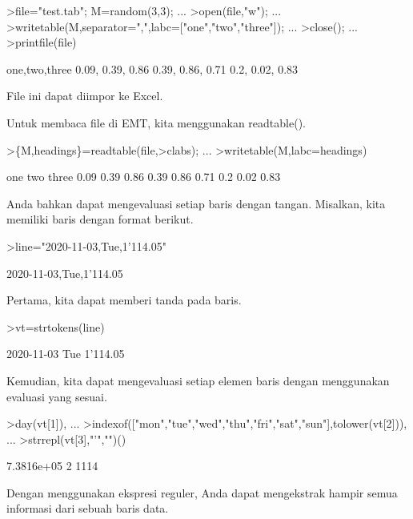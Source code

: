 \documentclass[a4paper,10pt]{article}
\begin{document}
\begin{eulernotebook}
\begin{eulercomment}
\begin{eulercomment}
\begin{eulercomment}
\begin{eulercomment}
\begin{eulerprompt}
>file="test.tab"; M=random(3,3);  ...
>open(file,"w");  ...
>writetable(M,separator=",",labc=["one","two","three"]);  ...
>close(); ...
>printfile(file)
\end{eulerprompt}
\begin{euleroutput}
  one,two,three
        0.09,      0.39,      0.86
        0.39,      0.86,      0.71
         0.2,      0.02,      0.83
\end{euleroutput}
\begin{eulercomment}
File ini dapat diimpor ke Excel.

Untuk membaca file di EMT, kita menggunakan readtable().
\end{eulercomment}
\begin{eulerprompt}
>\{M,headings\}=readtable(file,>clabs); ...
>writetable(M,labc=headings)
\end{eulerprompt}
\begin{euleroutput}
         one       two     three
        0.09      0.39      0.86
        0.39      0.86      0.71
         0.2      0.02      0.83
\end{euleroutput}
\begin{eulercomment}
Anda bahkan dapat mengevaluasi setiap baris dengan tangan. Misalkan,
kita memiliki baris dengan format berikut.
\end{eulercomment}
\begin{eulerprompt}
>line="2020-11-03,Tue,1'114.05"
\end{eulerprompt}
\begin{euleroutput}
  2020-11-03,Tue,1'114.05
\end{euleroutput}
\begin{eulercomment}
Pertama, kita dapat memberi tanda pada baris.
\end{eulercomment}
\begin{eulerprompt}
>vt=strtokens(line)
\end{eulerprompt}
\begin{euleroutput}
  2020-11-03
  Tue
  1'114.05
\end{euleroutput}
\begin{eulercomment}
Kemudian, kita dapat mengevaluasi setiap elemen baris dengan
menggunakan evaluasi yang sesuai.
\end{eulercomment}
\begin{eulerprompt}
>day(vt[1]),  ...
>indexof(["mon","tue","wed","thu","fri","sat","sun"],tolower(vt[2])),  ...
>strrepl(vt[3],"'","")()
\end{eulerprompt}
\begin{euleroutput}
  7.3816e+05
  2
  1114
\end{euleroutput}
\begin{eulercomment}
Dengan menggunakan ekspresi reguler, Anda dapat mengekstrak hampir
semua informasi dari sebuah baris data.


\end{eulercomment}
\end{eulercomment}
\end{eulercomment}
\end{eulercomment}
\end{eulercomment}
\end{eulernotebook}
\end{document}
